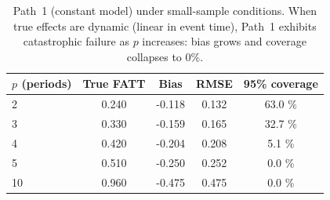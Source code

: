 \begin{table}[htbp]
\centering
\caption{Path~1 (constant model) under small-sample conditions.
When true effects are dynamic (linear in event time), Path~1 exhibits catastrophic failure
as \(p\) increases: bias grows and coverage collapses to 0\%.}
\label{tab:section8_3a}
\begin{tabular}{lcccc}
\toprule
\(p\) (periods) & True FATT & Bias & RMSE & 95\% coverage \\
\midrule
2 &
0.240
 &
-0.118
 &
0.132
 &
63.0
\% \\
3 &
0.330
 &
-0.159
 &
0.165
 &
32.7
\% \\
4 &
0.420
 &
-0.204
 &
0.208
 &
5.1
\% \\
5 &
0.510
 &
-0.250
 &
0.252
 &
0.0
\% \\
10 &
0.960
 &
-0.475
 &
0.475
 &
0.0
\% \\
\bottomrule
\end{tabular}
\end{table}

